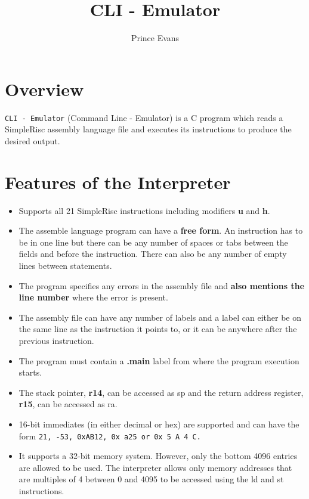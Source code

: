 \documentclass[12pt]{article}
\title{\textbf{CLI - Emulator}}
\author{Prince Evans }
\date{}
\begin{document}
\maketitle

\section*{Overview}
\texttt{CLI - Emulator} (Command Line - Emulator) is a C program which reads a SimpleRisc assembly language file and executes its instructions to produce the desired output.

\section*{Features of the Interpreter}
\begin{itemize}[leftmargin=*]
  \item Supports all 21 SimpleRisc instructions including modifiers \textbf{u} and \textbf{h}.
  
  \item The assemble language program can have a \textbf{free form}. An instruction has to be in one
line but there can be any number of spaces or tabs between the fields and before the
instruction. There can also be any number of empty lines between statements.

  \item The program specifies any errors in the assembly file and \textbf{also mentions the line
number} where the error is present.

  \item The assembly file can have any number of labels and a label can either be on the same
line as the instruction it points to, or it can be anywhere after the previous instruction.

  \item The program must contain a \textbf{.main} label from where the program execution starts.
  
  \item The stack pointer, \textbf{r14}, can be accessed as sp and the return address register, \textbf{r15}, can be
accessed as ra.

  \item 16-bit immediates (in either decimal or hex) are supported and can have the form \texttt{21, -53,
0xAB12, 0x a25 or 0x  5     A 4    C.}

  \item It supports a 32-bit memory system. However, only the bottom 4096 entries are allowed
to be used. The interpreter allows only memory addresses that are multiples of 4 between
0 and 4095 to be accessed using the ld and st instructions.


\end{itemize}
\end{document}
